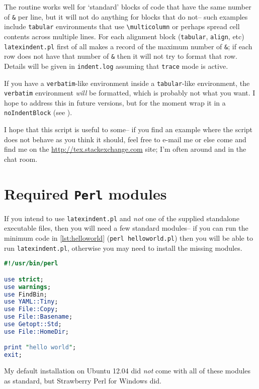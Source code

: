 The routine works well for `standard' blocks of code that have the same number of \lstinline!&!
per line, but it will not do anything for blocks that do not-- such examples 
include \lstinline!tabular! environments that use \lstinline!\multicolumn! or 
perhaps spread cell contents across multiple lines.  For each alignment block (\lstinline!tabular!, 
\lstinline!align!, etc) \lstinline!latexindent.pl! first of all makes a record 
of the maximum number of \lstinline!&!; if each row does not have that 
number of \lstinline!&! then it will not try to format that row. Details 
will be given in \lstinline!indent.log! assuming that \lstinline!trace! mode
is active.

If you have a \lstinline!verbatim!-like environment inside a \lstinline!tabular!-like
environment, the \lstinline!verbatim! environment \emph{will} be formatted, which 
is probably not what you want. I hope to address this in future versions, but for the 
moment wrap it in a \lstinline!noIndentBlock! (see ).
      
I hope that this script is useful to some-- if you find an example where the 
script does not behave as you think it should, feel free to e-mail me or else
come and find me on the \url{http://tex.stackexchange.com} site; I'm often around 
and in the chat room.
      
\printbibliography[heading=bibintoc]

\appendix
\section{Required \lstinline!Perl! modules}\label{sec:requiredmodules}
If you intend to use \lstinline!latexindent.pl! and \emph{not} one of the supplied standalone executable files, then you will need a few standard modules-- if you can run the 
minimum code in \cref{lst:helloworld} (\lstinline!perl helloworld.pl!) then you will be able to run \lstinline!latexindent.pl!, otherwise you may 
need to install the missing modules.
 	 	 	 	 	
\begin{lstlisting}[language=Perl,caption={\lstinline!helloworld.pl!},label={lst:helloworld}]
#!/usr/bin/perl

use strict;
use warnings;           
use FindBin;            
use YAML::Tiny;         
use File::Copy;         
use File::Basename;     
use Getopt::Std;        
use File::HomeDir;      

print "hello world";
exit;
\end{lstlisting}
My default installation on Ubuntu 12.04 did \emph{not} come
with all of these modules as standard, but Strawberry Perl for Windows \cite{strawberryperl}
did.
	
